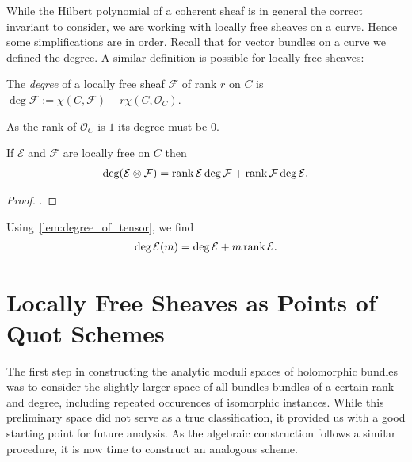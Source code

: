 \documentclass[12pt]{ociamthesis}  %
\begin{document}
While the Hilbert polynomial of a coherent sheaf is in general the
correct invariant to consider, we are working with locally free
sheaves on a curve. Hence some simplifications are in order.
Recall that for vector bundles on a curve we defined the degree.
A similar definition is possible for locally free sheaves:

\begin{definition}
  The \emph{degree} of a locally free sheaf $\mathcal F$ of rank $r$
  on $C$ is $\deg \mathcal F := \chi (C,\mathcal F) - r\chi(C,\mathcal O_C)$.
\end{definition}

\begin{example}
  As the rank of $\mathcal O_C$ is $1$ its degree must be $0$.
\end{example}

\begin{lemma}\label{lem:degree_of_tensor}
  If $\mathcal E$ and $\mathcal F$ are locally free on $C$ then
  \begin{align*}
    \deg(\mathcal E\otimes\mathcal F) = \operatorname{rank}\mathcal E\deg\mathcal F + \operatorname{rank}\mathcal F\deg\mathcal E.
  \end{align*}
  \begin{proof}
    \cite[Exercise 8.24]{hoskins2016}.
    \missingproof
  \end{proof}
\end{lemma}

\begin{example}
  Using~\ref{lem:degree_of_tensor}, we find 
  \begin{align*}
    \deg \mathcal E(m) = \deg\mathcal E + m\operatorname{rank}\mathcal E.
  \end{align*}
\end{example}

\missingsection

\section{Locally Free Sheaves as Points of Quot Schemes}

The first step in constructing the analytic moduli spaces of
holomorphic bundles was to consider the slightly larger space of
all bundles bundles of a certain rank and degree, including repeated
occurences of isomorphic instances. While this preliminary space
did not serve as a true
classification,
it provided us with a good starting point for future analysis. As the
algebraic construction follows a similar procedure, it is now
time to construct an analogous scheme.
\end{document}
